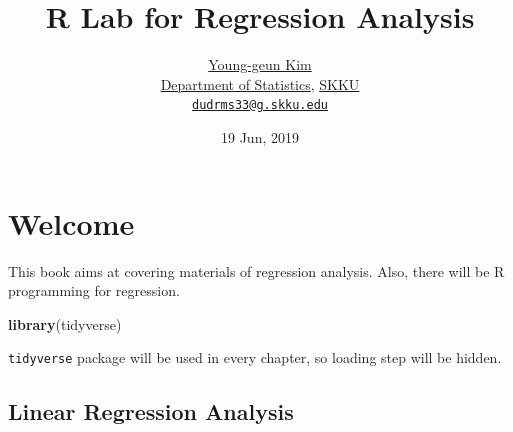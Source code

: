 \documentclass[]{book}
\title{R Lab for Regression Analysis}
\author{\href{https://github.com/ygeunkim}{Young-geun Kim}\\
\href{https://stat.skku.edu/stat/index.jsp}{Department of Statistics}, \href{https://www.skku.edu/skku/index.do}{SKKU}\\
\href{mailto:dudrms33@g.skku.edu}{\nolinkurl{dudrms33@g.skku.edu}}}
\date{19 Jun, 2019}
\newenvironment{Shaded}{\begin{snugshade}}{\end{snugshade}}
\newcommand{\CommentTok}[1]{\textcolor[rgb]{0.56,0.35,0.01}{\textit{#1}}}
\newcommand{\DataTypeTok}[1]{\textcolor[rgb]{0.13,0.29,0.53}{#1}}
\newcommand{\KeywordTok}[1]{\textcolor[rgb]{0.13,0.29,0.53}{\textbf{#1}}}
\newcommand{\NormalTok}[1]{#1}
\newcommand{\OperatorTok}[1]{\textcolor[rgb]{0.81,0.36,0.00}{\textbf{#1}}}
\newcommand{\StringTok}[1]{\textcolor[rgb]{0.31,0.60,0.02}{#1}}
\let\oldmaketitle\maketitle
\theoremstyle{definition}
\theoremstyle{definition}
\theoremstyle{definition}
\theoremstyle{remark}
\begin{document}
\maketitle

\begin{titlepage}
  
\end{titlepage}

\let\maketitle\oldmaketitle
\maketitle

{
\setcounter{tocdepth}{1}
\tableofcontents
}
\hypertarget{welcome}{%
\chapter*{Welcome}\label{welcome}}

This book aims at covering materials of regression analysis. Also, there will be R programming for regression.

\begin{Shaded}
\begin{Highlighting}[]
\KeywordTok{library}\NormalTok{(tidyverse)}
\end{Highlighting}
\end{Shaded}

\texttt{tidyverse} package will be used in every chapter, so loading step will be hidden.

\hypertarget{linear-regression-analysis}{%
\section*{Linear Regression Analysis}\label{linear-regression-analysis}}

\begin{Shaded}
\end{Shaded}
\end{document}
